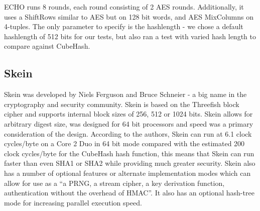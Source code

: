 ECHO runs 8 rounds, each round consisting of 2 AES rounds.  Additionally, it uses a ShiftRows similar to AES but on 128 bit words, and AES MixColumns on 4-tuples. The only parameter to specify is the hashlength - we chose a default hashlength of 512 bits for our tests, but also ran a test with varied hash length to compare against CubeHash.

\subsection*{Skein}
Skein was developed by Niels Ferguson and Bruce Schneier - a big name in the cryptography and security community.
Skein is based on the Threefish block cipher and supports internal block sizes of 256, 512 or 1024 bits.
Skein allows for arbitrary digest size, was designed for 64 bit processors and speed was a primary consideration of the design.
According to the authors, Skein can run at 6.1 clock cycles/byte on a Core 2 Duo in 64 bit mode\cite{SkeinSpeed} compared with the estimated 200 clock cycles/byte for the CubeHash hash function, this means that Skein can run faster than even SHA1 or SHA2 while providing much greater security.
Skein also has a number of optional features or alternate implementation modes which can allow for use as a ``a PRNG, a stream cipher, a key derivation function, authentication without the overhead of HMAC''\cite{SkeinSpeed}.
It also has an optional hash-tree mode for increasing parallel execution speed. 

